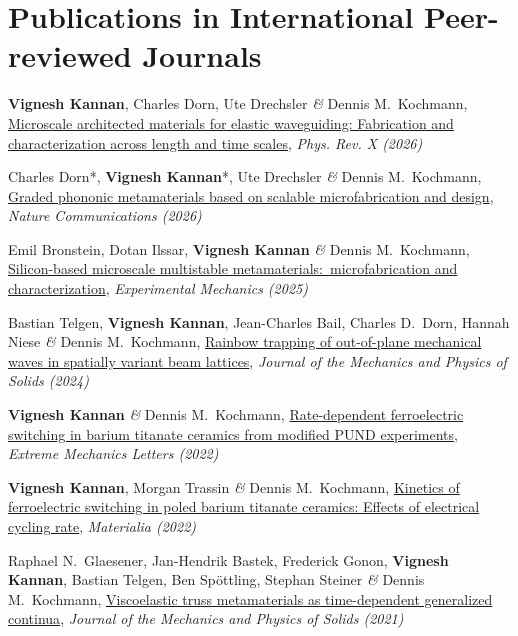 \documentclass[a4paper,10pt, oneside]{article}
\begin{document}
	\section*{{Publications in International Peer-reviewed Journals}}
	\begin{enumerate}[label={[\arabic*]}, leftmargin=*]
		\item \textbf{Vignesh Kannan}, Charles Dorn, Ute Drechsler \emph{\&} Dennis M.~Kochmann, \href{https://doi.org/10.1103/21w4-zn1s}{Microscale architected materials for elastic waveguiding: Fabrication and characterization across length and time scales}, \textit{Phys. Rev. X (2026)}
		\item Charles Dorn*, \textbf{Vignesh Kannan}*, Ute Drechsler \emph{\&} Dennis M.~Kochmann, \href{https://doi.org/10.1038/s41467-026-69888-x}{Graded phononic metamaterials based on scalable microfabrication and design}, \textit{Nature Communications (2026)}
		\item Emil Bronstein, Dotan Ilssar, \textbf{Vignesh Kannan} \emph{\&} Dennis M.~Kochmann, \href{https://doi.org/10.1007/s11340-025-01258-y
		}{Silicon-based microscale multistable metamaterials:~microfabrication and characterization}, \textit{Experimental Mechanics (2025)}
		\item Bastian Telgen, \textbf{Vignesh Kannan}, Jean-Charles Bail, Charles D.~Dorn, Hannah Niese \emph{\&} Dennis M.~Kochmann, \href{https://doi.org/10.1016/j.jmps.2024.105762}{Rainbow trapping of out-of-plane mechanical waves in spatially variant beam lattices}, \textit{Journal of the Mechanics and Physics of Solids (2024)} \label{jmps2024}
		\item \textbf{Vignesh Kannan} \emph{\&} Dennis M.~Kochmann, \href{https://doi.org/10.1016/j.eml.2022.101898}{Rate-dependent ferroelectric switching in barium titanate ceramics from modified PUND experiments}, \textit{Extreme Mechanics Letters (2022)} \label{eml2022}
		\item \textbf{Vignesh Kannan}, Morgan Trassin  \emph{\&} Dennis M.~Kochmann, \href{https://doi.org/10.1016/j.mtla.2022.101553}{Kinetics of ferroelectric switching in poled barium titanate ceramics: Effects of electrical cycling rate}, \textit{Materialia (2022)} \label{mat2022}
		\item Raphael N.~Glaesener, Jan-Hendrik Bastek, Frederick Gonon, \textbf{Vignesh Kannan}, Bastian Telgen, Ben Sp\"{o}ttling, Stephan Steiner \emph{\&} Dennis M.~Kochmann, \href{https://www.sciencedirect.com/science/article/pii/S0022509621002180}{Viscoelastic truss metamaterials as time-dependent generalized continua}, \textit{Journal of the Mechanics and Physics of Solids (2021)} \label{jmps2021}

\end{enumerate}
\end{document}
